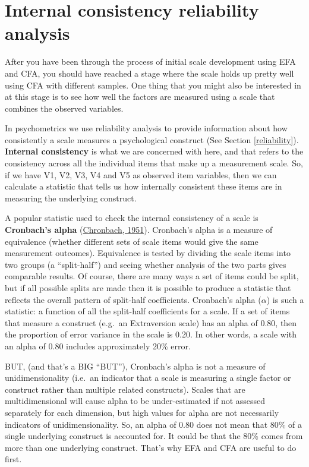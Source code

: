 \documentclass[
]{book}
\begin{document}
\hypertarget{rel}{%
\section{Internal consistency reliability analysis}\label{rel}}

After you have been through the process of initial scale development using EFA and CFA, you should have reached a stage where the scale holds up pretty well using CFA with different samples. One thing that you might also be interested in at this stage is to see how well the factors are measured using a scale that combines the observed variables.

In psychometrics we use reliability analysis to provide information about how consistently a scale measures a psychological construct (See Section \ref{reliability}). {\textbf{Internal consistency}} is what we are concerned with here, and that refers to the consistency across all the individual items that make up a measurement scale. So, if we have V1, V2, V3, V4 and V5 as observed item variables, then we can calculate a statistic that tells us how internally consistent these items are in measuring the underlying construct.

A popular statistic used to check the internal consistency of a scale is {\textbf{Cronbach's alpha}} (\protect\hyperlink{ref-Cronbach1951}{Chronbach, 1951}). Cronbach's alpha is a measure of equivalence (whether different sets of scale items would give the same measurement outcomes). Equivalence is tested by dividing the scale items into two groups (a ``split-half'') and seeing whether analysis of the two parts gives comparable results. Of course, there are many ways a set of items could be split, but if all possible splits are made then it is possible to produce a statistic that reflects the overall pattern of split-half coefficients. Cronbach's alpha (\(\alpha\)) is such a statistic: a function of all the split-half coefficients for a scale. If a set of items that measure a construct (e.g.~an Extraversion scale) has an alpha of 0.80, then the proportion of error variance in the scale is 0.20. In other words, a scale with an alpha of 0.80 includes approximately 20\% error.

BUT, (and that's a BIG ``BUT''), Cronbach's alpha is not a measure of unidimensionality (i.e.~an indicator that a scale is measuring a single factor or construct rather than multiple related constructs). Scales that are multidimensional will cause alpha to be under-estimated if not assessed separately for each dimension, but high values for alpha are not necessarily indicators of unidimensionality. So, an alpha of 0.80 does not mean that 80\% of a single underlying construct is accounted for. It could be that the 80\% comes from more than one underlying construct. That's why EFA and CFA are useful to do first.
\end{document}
